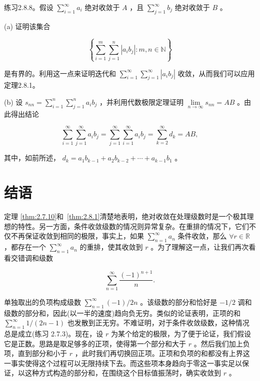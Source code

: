 练习2.8.8。假设 \(\mathop{\sum }\limits_{{i = 1}}^{\infty }{a}_{i}\) 绝对收敛于 \(A\) ，且 \(\mathop{\sum }\limits_{{j = 1}}^{\infty }{b}_{j}\) 绝对收敛于 \(B\) 。

(a) 证明该集合

\[
\left\{  {\mathop{\sum }\limits_{{i = 1}}^{m}\mathop{\sum }\limits_{{j = 1}}^{n}\left| {{a}_{i}{b}_{j}}\right|  : m,n \in  \mathbb{N}}\right\}
\]

是有界的。利用这一点来证明迭代和 \(\mathop{\sum }\limits_{{i = 1}}^{\infty }\mathop{\sum }\limits_{{j = 1}}^{\infty }\left| {{a}_{i}{b}_{j}}\right|\) 收敛，从而我们可以应用定理2.8.1。

(b) 设 \({s}_{nn} = \mathop{\sum }\limits_{{i = 1}}^{n}\mathop{\sum }\limits_{{j = 1}}^{n}{a}_{i}{b}_{j}\) ，并利用代数极限定理证明 \(\mathop{\lim }\limits_{{n \rightarrow  \infty }}{s}_{nn} = {AB}\) 。由此得出结论

\[
\mathop{\sum }\limits_{{i = 1}}^{\infty }\mathop{\sum }\limits_{{j = 1}}^{\infty }{a}_{i}{b}_{j} = \mathop{\sum }\limits_{{j = 1}}^{\infty }\mathop{\sum }\limits_{{i = 1}}^{\infty }{a}_{i}{b}_{j} = \mathop{\sum }\limits_{{k = 2}}^{\infty }{d}_{k} = {AB},
\]

其中，如前所述， \({d}_{k} = {a}_{1}{b}_{k - 1} + {a}_{2}{b}_{k - 2} + \cdots  + {a}_{k - 1}{b}_{1}\) 。

\section{结语}
\label{sec:2.9}
定理 \ref{thm:2.7.10}和~\ref{thm:2.8.1}清楚地表明，绝对收敛在处理级数时是一个极其理想的特性。另一方面，条件收敛级数的情况则异常复杂。在重排的情况下，它们不仅不再保证收敛到相同的极限，事实上，如果 \(\mathop{\sum }\limits_{{n = 1}}^{\infty }{a}_{n}\) 条件收敛，那么 \(\forall r \in  \mathbb{R}\) ，都存在一个 \(\mathop{\sum }\limits_{{n = 1}}^{\infty }{a}_{n}\) 的重排，使其收敛到 \(r\) 。为了理解这一点，让我们再次看看交错调和级数

\[
\mathop{\sum }\limits_{{n = 1}}^{\infty }\frac{{\left( -1\right) }^{n + 1}}{n}.
\]

单独取出的负项构成级数 \(\mathop{\sum }\limits_{{n = 1}}^{\infty }\left( {-1}\right) /{2n}\) 。该级数的部分和恰好是 \(- 1/2\) 调和级数的部分和，因此(以一半的速度)趋向负无穷。类似的论证表明，正项的和 \(\mathop{\sum }\limits_{{n = 1}}^{\infty }1/\left( {{2n} - 1}\right)\) 也发散到正无穷。不难证明，对于条件收敛级数，这种情况总是成立(练习 2.7.3)。现在，设 \(r\) 为某个给定的极限，为了便于论证，我们假设它是正数。思路是取足够多的正项，使得第一个部分和大于 \(r\) 。然后我们加上负项，直到部分和小于 \(r\) ，此时我们再切换回正项。正项和负项的和都没有上界这一事实使得这个过程可以无限持续下去。而这些项本身趋向于零这一事实足以保证，以这种方式构造的部分和，在围绕这个目标值振荡时，确实收敛到 \(r\) 。

